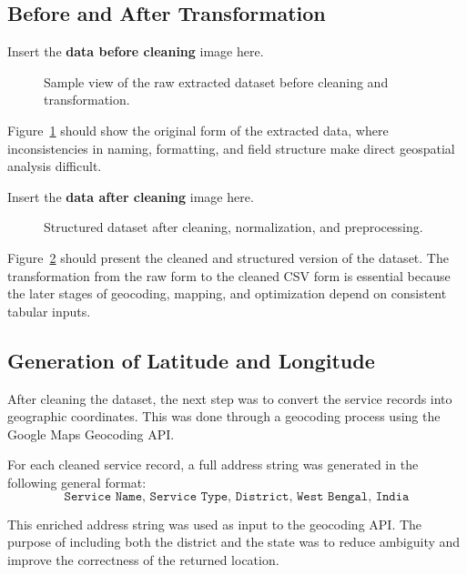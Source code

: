 \subsection{Before and After Transformation}

Insert the \textbf{data before cleaning} image here.

\begin{figure}[h!]
\centering
\caption{Sample view of the raw extracted dataset before cleaning and transformation.}
\label{fig:data_before_cleaning}
\end{figure}

Figure~\ref{fig:data_before_cleaning} should show the original form of the extracted data, where inconsistencies in naming, formatting, and field structure make direct geospatial analysis difficult.

Insert the \textbf{data after cleaning} image here.

\begin{figure}[h!]
\centering
\caption{Structured dataset after cleaning, normalization, and preprocessing.}
\label{fig:data_after_cleaning}
\end{figure}

Figure~\ref{fig:data_after_cleaning} should present the cleaned and structured version of the dataset. The transformation from the raw form to the cleaned CSV form is essential because the later stages of geocoding, mapping, and optimization depend on consistent tabular inputs.

\subsection{Generation of Latitude and Longitude}

After cleaning the dataset, the next step was to convert the service records into geographic coordinates. This was done through a geocoding process using the Google Maps Geocoding API.

For each cleaned service record, a full address string was generated in the following general format:
\[
\texttt{Service Name, Service Type, District, West Bengal, India}
\]

This enriched address string was used as input to the geocoding API. The purpose of including both the district and the state was to reduce ambiguity and improve the correctness of the returned location.


